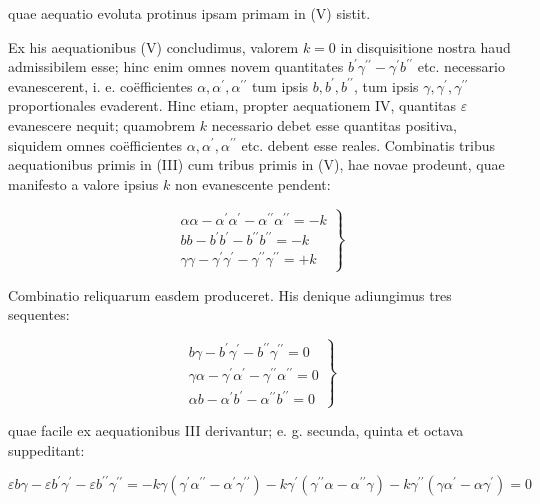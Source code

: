 \documentclass[twoside,12pt, showframe]{memoir}
\begin{document}
quae aequatio evoluta protinus ipsam primam in (V) sistit.

Ex his aequationibus (V) concludimus, valorem \(k=0\) in disquisitione nostra haud admissibilem esse; hinc enim omnes novem quantitates \(b^{\prime} \gamma^{\prime \prime}-\gamma^{\prime} b^{\prime \prime}\) etc. necessario evanescerent, i. e. coëfficientes \(\alpha, \alpha^{\prime}, \alpha^{\prime \prime}\) tum ipsis \(b, b^{\prime}, b^{\prime \prime}\), tum ipsis \(\gamma, \gamma^{\prime}, \gamma^{\prime \prime}\) proportionales evaderent. Hinc etiam, propter aequationem IV, quantitas \(\varepsilon\) evanescere nequit; quamobrem \(k\) necessario debet esse quantitas positiva, siquidem omnes coëfficientes \(\alpha, \alpha^{\prime}, \alpha^{\prime \prime}\) etc. debent esse reales. Combinatis tribus aequationibus primis in (III) cum tribus primis in (V), hae novae prodeunt, quae manifesto a valore ipsius \(k\) non evanescente pendent:

\[
\left.\begin{array}{l}
\alpha \alpha-\alpha^{\prime} \alpha^{\prime}-\alpha^{\prime \prime} \alpha^{\prime \prime}=-k \\
b b-b^{\prime} b^{\prime}-b^{\prime \prime} b^{\prime \prime}=-k \\
\gamma \gamma-\gamma^{\prime} \gamma^{\prime}-\gamma^{\prime \prime} \gamma^{\prime \prime}=+k
\end{array}\right\}
\]

Combinatio reliquarum easdem produceret. His denique adiungimus tres sequentes:

\[
\left.\begin{array}{l}
b \gamma-b^{\prime} \gamma^{\prime}-b^{\prime \prime} \gamma^{\prime \prime}=0 \\
\gamma \alpha-\gamma^{\prime} \alpha^{\prime}-\gamma^{\prime \prime} \alpha^{\prime \prime}=0 \\
\alpha b-\alpha^{\prime} b^{\prime}-\alpha^{\prime \prime} b^{\prime \prime}=0
\end{array}\right\}
\]

quae facile ex aequationibus III derivantur; e. g. secunda, quinta et octava suppeditant:

\[
\varepsilon b \gamma-\varepsilon b^{\prime} \gamma^{\prime}-\varepsilon b^{\prime \prime} \gamma^{\prime \prime}=-k \gamma\left(\gamma^{\prime} \alpha^{\prime \prime}-\alpha^{\prime} \gamma^{\prime \prime}\right)-k \gamma^{\prime}\left(\gamma^{\prime \prime} \alpha-\alpha^{\prime \prime} \gamma\right)-k \gamma^{\prime \prime}\left(\gamma \alpha^{\prime}-\alpha \gamma^{\prime}\right)=0
\]
\end{document}
